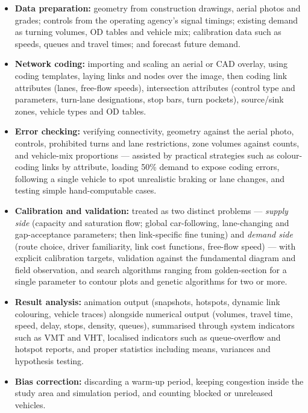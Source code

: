 \documentclass[11pt,a4paper]{article}
\begin{document}
\begin{itemize}
  \item \textbf{Data preparation:} geometry from construction drawings, aerial
        photos and grades; controls from the operating agency's signal timings;
        existing demand as turning volumes, OD tables and vehicle mix; calibration
        data such as speeds, queues and travel times; and forecast future demand.
  \item \textbf{Network coding:} importing and scaling an aerial or CAD overlay,
        using coding templates, laying links and nodes over the image, then coding
        link attributes (lanes, free-flow speeds), intersection attributes (control
        type and parameters, turn-lane designations, stop bars, turn pockets),
        source/sink zones, vehicle types and OD tables.
  \item \textbf{Error checking:} verifying connectivity, geometry against the aerial
        photo, controls, prohibited turns and lane restrictions, zone volumes against
        counts, and vehicle-mix proportions --- assisted by practical strategies such
        as colour-coding links by attribute, loading 50\% demand to expose coding
        errors, following a single vehicle to spot unrealistic braking or lane
        changes, and testing simple hand-computable cases.
  \item \textbf{Calibration and validation:} treated as two distinct problems ---
        \emph{supply side} (capacity and saturation flow; global car-following,
        lane-changing and gap-acceptance parameters; then link-specific fine tuning)
        and \emph{demand side} (route choice, driver familiarity, link cost
        functions, free-flow speed) --- with explicit calibration targets, validation
        against the fundamental diagram and field observation, and search algorithms
        ranging from golden-section for a single parameter to contour plots and
        genetic algorithms for two or more.
  \item \textbf{Result analysis:} animation output (snapshots, hotspots, dynamic link
        colouring, vehicle traces) alongside numerical output (volumes, travel time,
        speed, delay, stops, density, queues), summarised through system indicators
        such as VMT and VHT, localised indicators such as queue-overflow and hotspot
        reports, and proper statistics including means, variances and hypothesis
        testing.
  \item \textbf{Bias correction:} discarding a warm-up period, keeping congestion
        inside the study area and simulation period, and counting blocked or
        unreleased vehicles.
\end{itemize}
\end{document}

